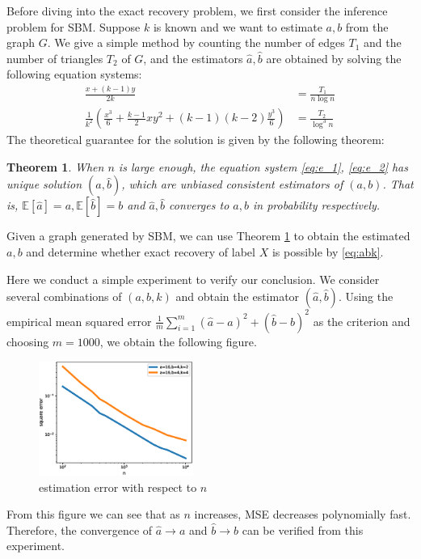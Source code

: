 \documentclass[journal]{IEEEtran}
\newtheorem{theorem}{Theorem}
\newcommand{\1}{\mathbbm{1}}
\begin{document}
Before diving into the exact recovery problem, we first consider the inference problem for SBM.
Suppose $k$ is known and we want to estimate $a,b$ from the graph $G$.
We give a simple method
by counting the number of edges $T_1$ and the number of triangles $T_2$ of $G$, and the estimators $\hat{a}, \hat{b}$ are
obtained by solving the following equation systems:
\begin{align}
\frac{x+(k-1)y}{2k} & = \frac{T_1}{n\log n} \label{eq:e_1}\\
\frac{1}{k^2}
\left(\frac{x^3}{6} + \frac{k-1}{2}xy^2 + (k-1)(k-2)\frac{y^3}{6}\right) & = \frac{T_2}{\log^3 n} \label{eq:e_2}
\end{align}
The theoretical guarantee for the solution is given by the following theorem:
\begin{theorem}\label{thm:ab12}
When $n$ is large enough, the equation system \eqref{eq:e_1}, \eqref{eq:e_2} has unique solution $(\hat{a}, \hat{b})$,
which are unbiased consistent estimators
of $(a,b)$. That is,
$\mathbb{E}[\hat{a}] = a, \mathbb{E}[\hat{b}] = b$ and $\hat{a}, \hat{b}$ converges to $a,b$ in probability respectively.
\end{theorem}
Given a graph generated by SBM, we can use Theorem \ref{thm:ab12} to obtain the estimated $a,b$ and determine whether
exact recovery of label $X$ is possible by \eqref{eq:abk}.

Here we conduct a simple experiment to verify our conclusion.
We consider several combinations of $(a,b,k)$ and obtain the estimator $(\hat{a}, \hat{b})$. Using
the empirical mean squared error $\frac{1}{m} \sum_{i=1}^m (\hat{a}-a)^2 + (\hat{b}-b)^2$ as the criterion
and choosing $m=1000$, we obtain the following figure.
\begin{figure}[!ht]
	\centering
	\includegraphics[width=0.45\textwidth]{estimator-error-2020-11-12.eps}
	\caption{estimation error with respect to $n$}
\end{figure}
From this figure we can see that as $n$ increases, MSE decreases polynomially fast. Therefore, the convergence
of $\hat{a} \to a$ and $\hat{b} \to b$ can be verified from this experiment.
\end{document}
